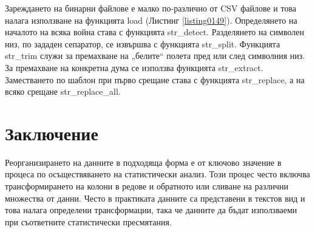 Зареждането на бинарни файлове е малко по-различно от CSV файлове и това налага използване на функцията load (Листинг \ref{listing0149}). Определянето на началото на всяка война става с функцията str\_detect. Разделянето на символен низ, по зададен сепаратор, се извършва с функцията str\_split.  Функцията str\_trim служи за премахване на „белите“ полета пред или след символния низ. За премахване на конкретна дума се използва функцията str\_extract. Заместването по шаблон при първо срещане става с функцията str\_replace, а на всяко срещане str\_replace\_all.

\section*{Заключение}

Реорганизирането на данните в подходяща форма е от ключово значение в процеса по осъществяването на статистически анализ. Този процес често включва трансформирането на колони в редове и обратното или сливане на различни множества от данни. Често в практиката данните са представени в текстов вид и това налага определени трансформации, така че данните да бъдат използваеми при съответните статистически пресмятания.

